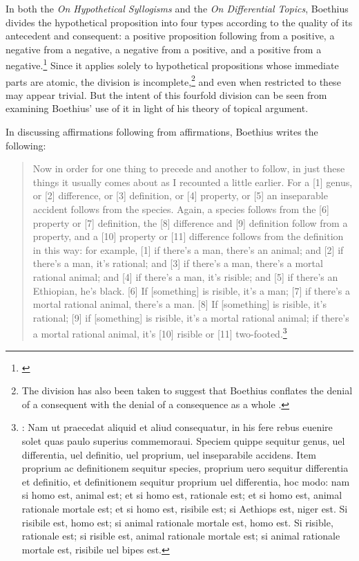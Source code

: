 \documentclass[a4paper, 11pt]{article}
\begin{document}
In both the \emph{On Hypothetical Syllogisms} and the \emph{On Differential Topics}, 
Boethius divides the hypothetical proposition into four types according to the quality of its antecedent and consequent: 
a positive proposition following from a positive, 
a negative from a negative, 
a negative from a positive, 
and a positive from a negative.\footnote{\autocite[1.3.5]{BHS} \autocite[1176B-C]{BDT}} Since it applies solely to hypothetical propositions whose immediate parts are atomic, the division is incomplete,\footnote{The division has also been taken to suggest that Boethius conflates the denial of a consequent with the denial of a consequence as a whole \autocite[157-158]{Martin2007}.} and even when restricted to these may appear trivial. But the intent of this fourfold division can be seen from examining Boethius' use of it in light of his theory of topical argument.

In discussing affirmations following from affirmations, Boethius writes the following:
\begin{quote}
Now in order for one thing to precede and another to follow, in just these things it usually comes about as I recounted a little earlier. For a [1] genus, or [2] difference, or [3] definition, or [4] property, or [5] an inseparable accident follows from the species. Again, a species follows from the [6] property or [7] definition, the [8] difference and [9] definition follow from a property, and a [10] property or [11] difference follows from the definition in this way: for example, [1] if there's a man, there's an animal; and [2] if there's a man, it's rational; and [3] if there's a man, there's a mortal rational animal; and [4] if there's a man, it's risible; and [5] if there's an Ethiopian, he's black. [6] If [something] is risible, it's a man; [7] if there's a mortal rational animal, there's a man. [8] If [something] is risible, it's rational; [9] if [something] is risible, it's a mortal rational animal; if there's a mortal rational animal, it's [10] risible or [11] two-footed.\footnote{\autocite[1179A-B]{BDT}: Nam ut praecedat aliquid et aliud consequatur, in his fere rebus euenire solet quas paulo superius commemoraui. Speciem quippe sequitur genus, uel differentia, uel definitio, uel proprium, uel inseparabile accidens. Item proprium ac definitionem sequitur species, proprium uero sequitur differentia et definitio, et definitionem sequitur proprium uel differentia, hoc modo: nam si homo est, animal est; et si homo est, rationale est; et si homo est, animal rationale mortale est; et si homo est, risibile est; si Aethiops est, niger est. Si risibile est, homo est; si animal rationale mortale est, homo est. Si risible, rationale est; si risible est, animal rationale mortale est; si animal rationale mortale est, risibile uel bipes est.}
\end{quote}
\end{document}
